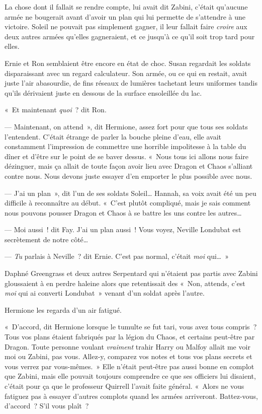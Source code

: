 La chose dont il fallait se rendre compte, lui avait dit Zabini, c'était qu'aucune armée ne bougerait avant d'avoir un plan qui lui permette de s'attendre à une victoire.
Soleil ne pouvait pas simplement gagner, il leur fallait faire \emph{croire} aux deux autres armées qu'elles gagneraient, et ce jusqu'à ce qu'il soit trop tard pour elles.

Ernie et Ron semblaient être encore en état de choc.
Susan regardait les soldats disparaissant avec un regard calculateur.
Son armée, ou ce qui en restait, avait juste l'air abasourdie, de fins réseaux de lumières tachetant leurs uniformes tandis qu'ils dérivaient juste en dessous de la surface ensoleillée du lac.

«~Et maintenant \emph{quoi}~? dit Ron.

--- Maintenant, on attend~», dit Hermione, assez fort pour que tous ses soldats l'entendent.
C'était étrange de parler la bouche pleine d'eau, elle avait constamment l'impression de commettre une horrible impolitesse à la table du dîner et d'être sur le point de se baver dessus.
«~Nous tous ici allons nous faire dézinguer, mais ça allait de toute façon avoir lieu avec Dragon et Chaos s'alliant contre nous.
Nous devons juste essayer d'en emporter le plus possible avec nous.

--- J'ai un plan~», dit l'un de ses soldats Soleil…
Hannah, sa voix avait été un peu difficile à reconnaître au début.
«~C'est plutôt compliqué, mais je sais comment nous pouvons pousser Dragon et Chaos à se battre les uns contre les autres…

--- Moi aussi~! dit Fay.
J'ai un plan aussi~!
Vous voyez, Neville Londubat est secrètement de notre côté…

--- \emph{Tu} parlais à Neville~? dit Ernie.
C'est pas normal, c'était \emph{moi} qui…~»

Daphné Greengrass et deux autres Serpentard qui n'étaient pas partis avec Zabini gloussaient à en perdre haleine alors que retentissait des «~Non, attends, c'est \emph{moi} qui ai converti Londubat~» venant d'un soldat après l'autre.

Hermione les regarda d'un air fatigué.

«~D'accord, dit Hermione lorsque le tumulte se fut tari, vous avez tous compris~?
Tous vos plans étaient fabriqués par la légion du Chaos, et certains peut-être par Dragon.
Toute personne voulant \emph{vraiment} trahir Harry ou Malfoy allait me voir moi ou Zabini, pas vous.
Allez-y, comparez vos notes et tous vos plans secrets et vous verrez par vous-mêmes.~»
Elle n'était peut-être pas aussi bonne en complot que Zabini, mais elle pouvait toujours comprendre ce que ses officiers lui disaient, c'était pour ça que le professeur Quirrell l'avait faite général.
«~Alors ne vous fatiguez pas à essayer d'autres complots quand les armées arriveront.
Battez-vous, d'accord~?
S'il vous plaît~?

